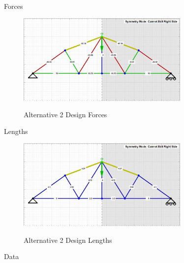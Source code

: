 \documentclass{article}
\begin{document}
Forces

\begin{figure}[!htb]
  \centering
  \includegraphics[width=0.75\textwidth]{assets/final_truss_3_forces.jpg}
  \label{fig:truss-forces-alt-2}
  \caption{Alternative 2 Design Forces}
\end{figure}

Lengths

\begin{figure}[!htb]
  \centering
  \includegraphics[width=0.75\textwidth]{assets/final_truss_3_lengths.jpg}
  \label{fig:truss-lengths-alt-2}
  \caption{Alternative 2 Design Lengths}
\end{figure}

\newpage

Data

\bigskip

\centering
{}

\newpage
\end{document}
